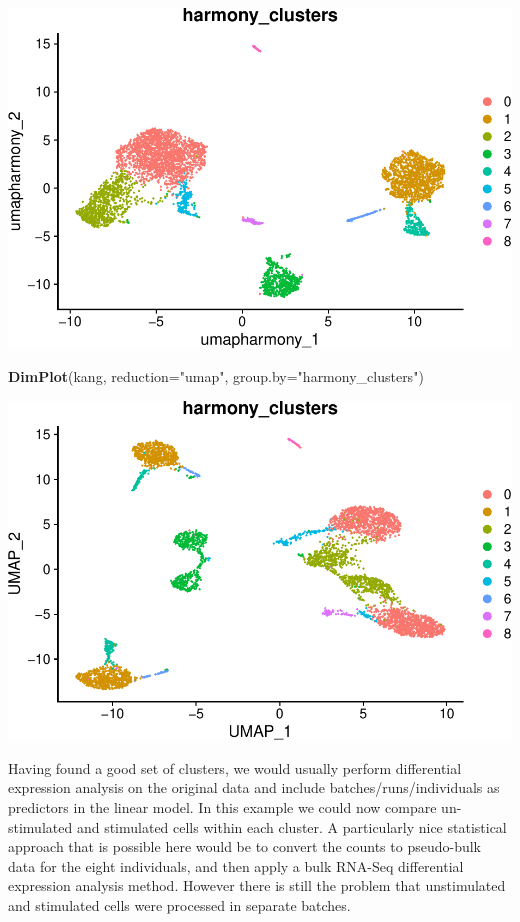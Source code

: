 \documentclass[
]{book}
\newenvironment{Shaded}{\begin{snugshade}}{\end{snugshade}}
\newcommand{\AttributeTok}[1]{\textcolor[rgb]{0.13,0.29,0.53}{#1}}
\newcommand{\FunctionTok}[1]{\textcolor[rgb]{0.13,0.29,0.53}{\textbf{#1}}}
\newcommand{\NormalTok}[1]{#1}
\newcommand{\StringTok}[1]{\textcolor[rgb]{0.31,0.60,0.02}{#1}}
\begin{document}
\includegraphics{scRNAseqInR_Doco_files/figure-latex/unnamed-chunk-70-2.pdf}

\begin{Shaded}
\begin{Highlighting}[]
\FunctionTok{DimPlot}\NormalTok{(kang, }\AttributeTok{reduction=}\StringTok{"umap"}\NormalTok{, }\AttributeTok{group.by=}\StringTok{"harmony\_clusters"}\NormalTok{)}
\end{Highlighting}
\end{Shaded}

\includegraphics{scRNAseqInR_Doco_files/figure-latex/unnamed-chunk-70-3.pdf}

Having found a good set of clusters, we would usually perform differential expression analysis on the original data and include batches/runs/individuals as predictors in the linear model. In this example we could now compare un-stimulated and stimulated cells within each cluster. A particularly nice statistical approach that is possible here would be to convert the counts to pseudo-bulk data for the eight individuals, and then apply a bulk RNA-Seq differential expression analysis method. However there is still the problem that unstimulated and stimulated cells were processed in separate batches.
\end{document}
